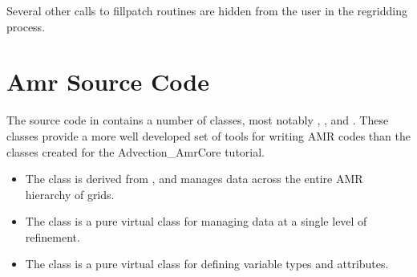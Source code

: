 \documentclass[letterpaper,10pt,english]{sphinxmanual}
\begin{document}
\sphinxAtStartPar
Several other calls to fillpatch routines are hidden from the user in the regridding process.


\chapter{Amr Source Code}
\label{\detokenize{AmrLevel_Chapter:amr-source-code}}\label{\detokenize{AmrLevel_Chapter:chap-amrlevel}}\label{\detokenize{AmrLevel_Chapter::doc}}
\sphinxAtStartPar
The source code in  contains a number of classes, most notably
, , and .
These classes provide a more well developed set of tools for writing AMR codes
than the classes created for the Advection\_AmrCore tutorial.
\begin{itemize}
\item {} 
\sphinxAtStartPar
The  class is derived from , and manages data across the
entire AMR hierarchy of grids.

\item {} 
\sphinxAtStartPar
The  class is a pure virtual class for managing data at a
single level of refinement.

\item {} 
\sphinxAtStartPar
The  class is a pure virtual class for defining variable types
and attributes.

\end{itemize}
\end{document}
